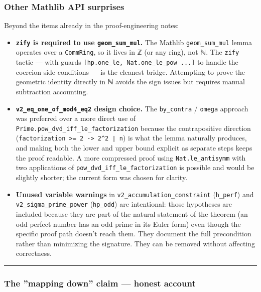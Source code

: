 \documentclass[12pt,a4paper]{article}
\begin{document}
\subsubsection{Other Mathlib API surprises}

Beyond the items already in the proof-engineering notes:

\begin{itemize}
    \item \textbf{\texttt{zify} is required to use \texttt{geom\_sum\_mul}.} The Mathlib \texttt{geom\_sum\_mul} lemma operates
over a \texttt{CommRing}, so it lives in ℤ (or any ring), not ℕ. The \texttt{zify} tactic --- with guards
\texttt{{[}hp.one\_le, Nat.one\_le\_pow ...{]}} to handle the coercion side conditions --- is the cleanest
bridge. Attempting to prove the geometric identity directly in ℕ avoids the sign issues but
requires manual subtraction accounting.
    \item \textbf{\texttt{v2\_eq\_one\_of\_mod4\_eq2} design choice.} The \texttt{by\_contra} / \texttt{omega} approach was preferred
over a more direct use of \texttt{Prime.pow\_dvd\_iff\_le\_factorization} because the contrapositive
direction (\texttt{factorization \textgreater{}= 2 -\textgreater{} 2\^{}2 ∣ n}) is what the lemma naturally produces, and making
both the lower and upper bound explicit as separate steps keeps the proof readable. A more
compressed proof using \texttt{Nat.le\_antisymm} with two applications of
\texttt{pow\_dvd\_iff\_le\_factorization} is possible and would be slightly shorter; the current form
was chosen for clarity.
    \item \textbf{Unused variable warnings} in \texttt{v2\_accumulation\_constraint} (\texttt{h\_perf}) and
\texttt{v2\_sigma\_prime\_power} (\texttt{hp\_odd}) are intentional: those hypotheses are included because
they are part of the natural statement of the theorem (an odd perfect number has an odd prime
in its Euler form) even though the specific proof path doesn't reach them. They document
the full precondition rather than minimizing the signature. They can be removed without
affecting correctness.
\end{itemize}

\begin{center}
\rule{0.5\textwidth}{0.4pt}
\end{center}

\subsubsection{The ''mapping down'' claim --- honest account}
\end{document}
